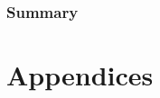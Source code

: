 \documentclass[pdftex,12pt]{article}
\begin{document}
\section{Summary} 

\newpage
\singlespacing
%
%


\part{Appendices}
%
%
%
\end{document}
